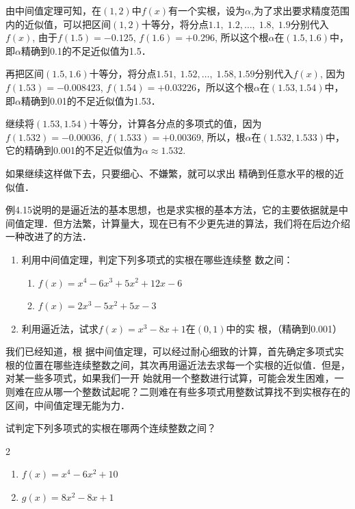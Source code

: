 \begin{solution}
    由中间值定理可知，在$(1, 2)$中$f(x)$有一个实根，设为$\alpha$,为了求出要求精度范围内的近似值，可以把区间$(1, 2)$十等分，将分点$1.1,\; 1.2,\ldots,\; 1.8,\; 1.9$分别代入$f(x)$, 由于$f(1. 5)=-0.125$, $f(1. 6)=+0.296$, 所以这个根$\alpha$在$(1.5, 1. 6)$中，即$\alpha$精确到0.1的不足近似值为1.5．
    
    再把区间$(1.5, 1. 6)$十等分，将分点$1.51,\; 1.52,\ldots,\; 1.58, 1.59$分别代入$f(x)$, 因为$f(1.53)=-0.008423$, $f(1.54)=+0.03226$，所以这个根$\alpha$在$(1.53, 1. 54)$中，即$\alpha$精确到0.01的不足近似值为1.53．

    继续将$(1.53, 1.54)$十等分，计算各分点的多项式的值，因为$f(1. 532)=-0. 00036$, $f(1. 533)=+0.00369$, 所以，根$\alpha$在$(1. 532, 1. 533)$中，它的精确到0.001的不足近似值为$\alpha\approx1.532$.

    如果继续这样做下去，只要细心、不嫌繁，就可以求出
    精确到任意水平的根的近似值．
\end{solution}

    例4.15说明的是逼近法的基本思想，也是求实根的基本方法，它的主要依据就是中间值定理．但方法繁，计算量大，现在已有不少更先进的算法，我们将在后边介绍一种改进了的方法．

\begin{ex}
\begin{enumerate}
    \item 利用中间值定理，判定下列多项式的实根在哪些连续整
数之间：
\begin{enumerate}
    \item $f (x) =x^4-6x^3+5x^2+12x-6$
    \item $f (x) =2x^3-5x^2+5x-3$
\end{enumerate}
\item 利用逼近法，试求$f(x)=x^3-8x+1$在$(0, 1)$中的实
根，（精确到0.001）
\end{enumerate}
\end{ex}


我们已经知道，根
据中间值定理，可以经过耐心细致的计算，首先确定多项式实根的位置在哪些连续整数之间，其次再用逼近法去求每一个实根的近似值．但是，对某一些多项式，如果我们一开
始就用一个整数进行试算，可能会发生困难，一则难在应从哪一个整数试起呢？二则难在有些多项式用整数试算找不到实根存在的区间，中间值定理无能为力．

\begin{example}
   试判定下列多项式的实根在哪两个连续整数之间？
\begin{multicols}{2}
 \begin{enumerate}
     \item $f (x) =x^4-6x^2+10$
     \item $g(x)=8x^2-8x+1$
 \end{enumerate}
\end{multicols}
\end{example}

